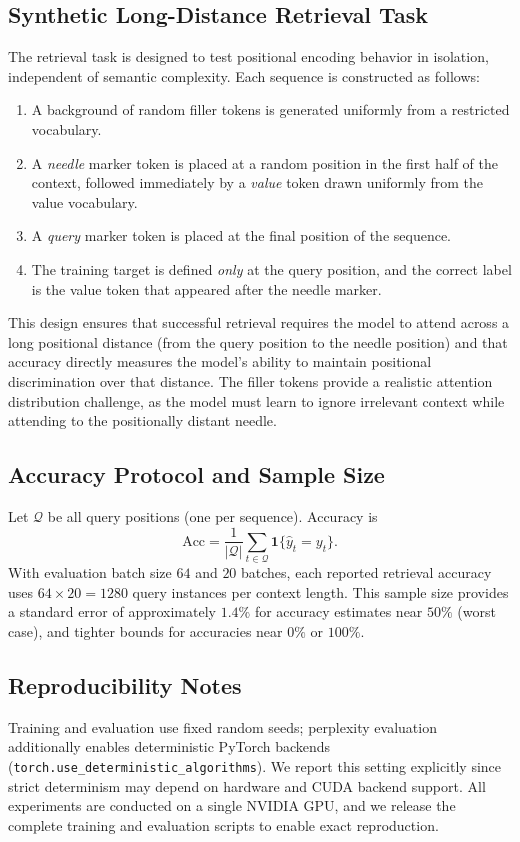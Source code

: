 \documentclass[conference]{IEEEtran}
\begin{document}
\subsection{Synthetic Long-Distance Retrieval Task}
The retrieval task is designed to test positional encoding behavior in isolation, independent of semantic complexity. Each sequence is constructed as follows:
\begin{enumerate}
\item A background of random filler tokens is generated uniformly from a restricted vocabulary.
\item A \emph{needle} marker token is placed at a random position in the first half of the context, followed immediately by a \emph{value} token drawn uniformly from the value vocabulary.
\item A \emph{query} marker token is placed at the final position of the sequence.
\item The training target is defined \emph{only} at the query position, and the correct label is the value token that appeared after the needle marker.
\end{enumerate}
This design ensures that successful retrieval requires the model to attend across a long positional distance (from the query position to the needle position) and that accuracy directly measures the model's ability to maintain positional discrimination over that distance. The filler tokens provide a realistic attention distribution challenge, as the model must learn to ignore irrelevant context while attending to the positionally distant needle.

\subsection{Accuracy Protocol and Sample Size}
Let $\mathcal{Q}$ be all query positions (one per sequence). Accuracy is
\begin{equation}
\mathrm{Acc}=\frac{1}{|\mathcal{Q}|}\sum_{t\in\mathcal{Q}}\mathbf{1}\{\hat y_t=y_t\}.
\end{equation}
With evaluation batch size $64$ and $20$ batches, each reported retrieval accuracy uses $64\times 20=1280$ query instances per context length. This sample size provides a standard error of approximately $1.4\%$ for accuracy estimates near $50\%$ (worst case), and tighter bounds for accuracies near $0\%$ or $100\%$.

\subsection{Reproducibility Notes}
Training and evaluation use fixed random seeds; perplexity evaluation additionally enables deterministic PyTorch backends (\texttt{torch.use\_deterministic\_algorithms}). We report this setting explicitly since strict determinism may depend on hardware and CUDA backend support. All experiments are conducted on a single NVIDIA GPU, and we release the complete training and evaluation scripts to enable exact reproduction.
\end{document}
